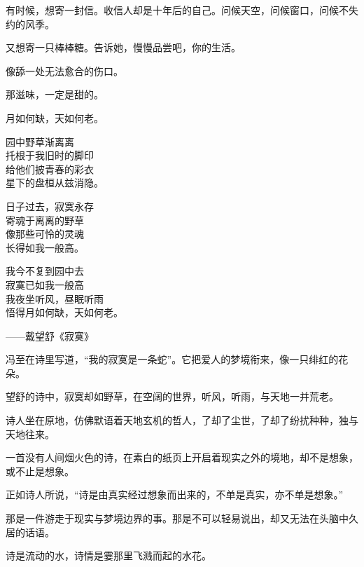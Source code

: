 \documentclass[12pt,a4paper]{article}
\begin{document}
		有时候，想寄一封信。收信人却是十年后的自己。问候天空，问候窗口，问候不失约的风季。

		又想寄一只棒棒糖。告诉她，慢慢品尝吧，你的生活。\par
		像舔一处无法愈合的伤口。

		那滋味，一定是甜的。

	\endwriting



		月如何缺，天如何老。

		\longpoem{}{}{}
		园中野草渐离离 \\
		托根于我旧时的脚印 \\
		给他们披青春的彩衣 \\
		星下的盘桓从兹消隐。

		日子过去，寂寞永存 \\
		寄魂于离离的野草 \\
		像那些可怜的灵魂 \\
		长得如我一般高。

		我今不复到园中去 \\
		寂寞已如我一般高 \\
		我夜坐听风，昼眠听雨 \\
		悟得月如何缺，天如何老。

		\hspace{4em} ——戴望舒《寂寞》
		\endlongpoem

		冯至在诗里写道，“我的寂寞是一条蛇”。它把爱人的梦境衔来，像一只绯红的花朵。\par
		望舒的诗中，寂寞却如野草，在空阔的世界，听风，听雨，与天地一并荒老。\par
		诗人坐在原地，仿佛默语着天地玄机的哲人，了却了尘世，了却了纷扰种种，独与天地往来。\par
		一首没有人间烟火色的诗，在素白的纸页上开启着现实之外的境地，却不是想象，或不止是想象。\par
		正如诗人所说，“诗是由真实经过想象而出来的，不单是真实，亦不单是想象。”\par
		那是一件游走于现实与梦境边界的事。那是不可以轻易说出，却又无法在头脑中久居的话语。\par
		诗是流动的水，诗情是霎那里飞溅而起的水花。
\end{document}
